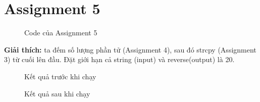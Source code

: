 \documentclass[a4paper,12pt]{article}
\begin{document}
\section{Assignment 5}
\begin{figure}[!h]
	\centerline{}
	\caption{Code của Assignment 5}
	\label{fig:ass5}
\end{figure}
\noindent
\textbf{Giải thích: }ta đếm số lượng phần tử (Assignment 4), sau đó strcpy (Assignment 3) từ cuối lên đầu. Đặt giới hạn cả string (input) và reverse(output) là 20. 
\begin{figure}[!h]
	\centerline{}
	\caption{Kết quả trước khi chạy}
	\label{fig:ass5_r1}
\end{figure}
\begin{figure}[!h]
	\centerline{}
	\caption{Kết quả sau khi chạy}
	\label{fig:ass5_r2}
\end{figure}
\end{document}
